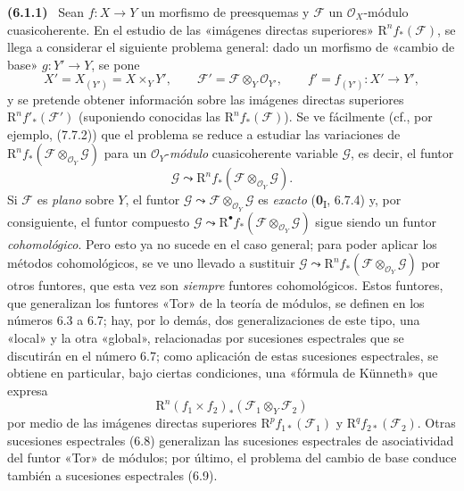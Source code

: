 \documentclass[10pt,oneside]{book}
\newenvironment{env}[1][]{\par\medskip\noindent\textbf{(#1)}\ }{\par}
\begin{document}
\begin{env}[6.1.1]
\label{III.6.1.1}
Sean $f:X\to Y$ un morfismo de preesquemas y $\mathscr F$ un
$\mathscr O_X$-módulo cuasicoherente. En el estudio de las «imágenes
directas superiores» $\mathrm R^n f_*(\mathscr F)$, se llega a considerar el
siguiente problema general: dado un morfismo de «cambio de base»
$g:Y'\to Y$, se pone
\[
  X'=X_{(Y')}=X\times_Y Y',\qquad
  \mathscr F'=\mathscr F\otimes_Y\mathscr O_{Y'},\qquad
  f'=f_{(Y')}:X'\to Y',
\]
y se pretende obtener información sobre las imágenes directas superiores
$\mathrm R^n f'_*(\mathscr F')$ (suponiendo conocidas las
$\mathrm R^n f_*(\mathscr F)$). Se ve fácilmente (cf., por ejemplo, (7.7.2))
que el problema se reduce a estudiar las variaciones de
$\mathrm R^n f_*(\mathscr F\otimes_{\mathscr O_Y}\mathscr G)$ para un
$\mathscr O_Y$-\emph{módulo} cuasicoherente variable $\mathscr G$, es decir, el
funtor
\[
  \mathscr G\leadsto
  \mathrm R^n f_*(\mathscr F\otimes_{\mathscr O_Y}\mathscr G).
\]
Si $\mathscr F$ es \emph{plano} sobre $Y$, el funtor
$\mathscr G\leadsto\mathscr F\otimes_{\mathscr O_Y}\mathscr G$ es \emph{exacto}
(\textbf{0}\textsubscript{I}, 6.7.4) y, por consiguiente, el funtor compuesto
$\mathscr G\leadsto\mathrm R^\bullet f_*(\mathscr F\otimes_{\mathscr O_Y}\mathscr G)$
sigue siendo un funtor \emph{cohomológico}. Pero esto ya no sucede en el caso
general; para poder aplicar los métodos cohomológicos, se ve uno llevado a
sustituir
$\mathscr G\leadsto\mathrm R^n f_*(\mathscr F\otimes_{\mathscr O_Y}\mathscr G)$
por otros funtores, que esta vez son \emph{siempre} funtores cohomológicos. Estos
funtores, que generalizan los funtores «Tor» de la teoría de módulos, se
definen en los números 6.3 a 6.7; hay, por lo demás, dos generalizaciones de
este tipo, una «local» y la otra «global», relacionadas por sucesiones
espectrales que se discutirán en el número 6.7; como aplicación de estas
sucesiones espectrales, se obtiene en particular, bajo ciertas condiciones,
una «fórmula de Künneth» que expresa
\[
  \mathrm R^n(f_1\times f_2)_*(\mathscr F_1\otimes_Y\mathscr F_2)
\]
por medio de las imágenes directas superiores
$\mathrm R^p f_{1*}(\mathscr F_1)$ y $\mathrm R^q f_{2*}(\mathscr F_2)$.
Otras sucesiones espectrales (6.8) generalizan las sucesiones espectrales de
asociatividad del funtor «Tor» de módulos; por último, el problema del cambio
de base conduce también a sucesiones espectrales (6.9).
\end{env}
\end{document}
